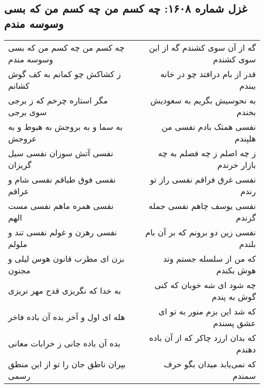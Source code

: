 \begin{center}
\section*{غزل شماره ۱۶۰۸: چه کسم من چه کسم من که بسی وسوسه مندم}
\label{sec:1608}
\begin{longtable}{l p{0.5cm} r}
چه کسم من چه کسم من که بسی وسوسه مندم
&&
گه از آن سوی کشندم گه از این سوی کشندم
\\
ز کشاکش چو کمانم به کف گوش کشانم
&&
قدر از بام درافتد چو در خانه ببندم
\\
مگر استاره چرخم که ز برجی سوی برجی
&&
به نحوسیش بگریم به سعودیش بخندم
\\
به سما و به بروجش به هبوط و به عروجش
&&
نفسی همتک بادم نفسی من هلپندم
\\
نفسی آتش سوزان نفسی سیل گریزان
&&
ز چه اصلم ز چه فصلم به چه بازار خرندم
\\
نفسی فوق طباقم نفسی شام و عراقم
&&
نفسی غرق فراقم نفسی راز تو رندم
\\
نفسی همره ماهم نفسی مست الهم
&&
نفسی یوسف چاهم نفسی جمله گزندم
\\
نفسی رهزن و غولم نفسی تند و ملولم
&&
نفسی زین دو برونم که بر آن بام بلندم
\\
بزن ای مطرب قانون هوس لیلی و مجنون
&&
که من از سلسله جستم وتد هوش بکندم
\\
به خدا که نگریزی قدح مهر نریزی
&&
چه شود ای شه خوبان که کنی گوش به پندم
\\
هله ای اول و آخر بده آن باده فاخر
&&
که شد این بزم منور به تو ای عشق پسندم
\\
بده آن باده جانی ز خرابات معانی
&&
که بدان ارزد چاکر که از آن باده دهندم
\\
بپران ناطق جان را تو از این منطق رسمی
&&
که نمی‌یابد میدان بگو حرف سمندم
\\
\end{longtable}
\end{center}
